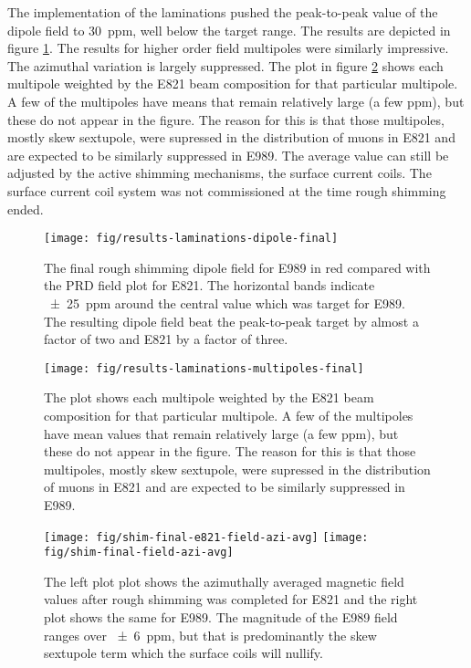 The implementation of the laminations pushed the peak-to-peak value of the dipole field to \SI{30}{ppm}, well below the target range.  The results are depicted in figure \ref{fig:results-laminations-dipole-final}.  The results for higher order field multipoles were similarly impressive.  The azimuthal variation is largely suppressed.  The plot in figure \ref{fig:results-laminations-multipoles-final} shows each multipole weighted by the E821 beam composition for that particular multipole.  A few of the multipoles have means that remain relatively large (a few ppm), but these do not appear in the figure.  The reason for this is that those multipoles, mostly skew sextupole, were supressed in the distribution of muons in E821 and are expected to be similarly suppressed in E989.  The average value can still be adjusted by the active shimming mechanisms, the surface current coils.  The surface current coil system was not commissioned at the time rough shimming ended.

\begin{figure}
\centering
\texttt{[image: fig/results-laminations-dipole-final]}
\caption{
    The final rough shimming dipole field for E989 in red compared with the PRD field plot for E821.  The horizontal bands indicate \SI{\pm 25}{ppm} around the central value which was target for E989.  The resulting dipole field beat the peak-to-peak target by almost a factor of two and E821 by a factor of three. 
    \label{fig:results-laminations-dipole-final}
}
\end{figure}

\begin{figure}
\centering
\texttt{[image: fig/results-laminations-multipoles-final]}
\caption{The plot shows each multipole weighted by the E821 beam composition for that particular multipole.  A few of the multipoles have mean values that remain relatively large (a few ppm), but these do not appear in the figure.  The reason for this is that those multipoles, mostly skew sextupole, were supressed in the distribution of muons in E821 and are expected to be similarly suppressed in E989. \label{fig:results-laminations-multipoles-final}}
\end{figure}

\begin{figure}
\centering
\texttt{[image: fig/shim-final-e821-field-azi-avg]}
\texttt{[image: fig/shim-final-field-azi-avg]}
\caption{
    The left plot plot shows the azimuthally averaged magnetic field values after rough shimming was completed for E821 and the right plot shows the same for E989.  The magnitude of the E989 field ranges over \SI{\pm 6}{ppm}, but that is predominantly the skew sextupole term which the surface coils will nullify.
    \label{fig/shim-field-final-azi-avg}
}
\end{figure}